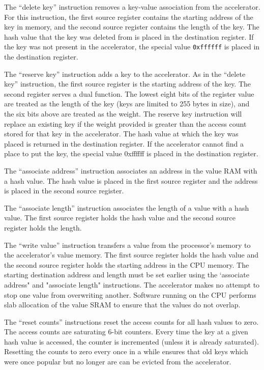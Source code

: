 The ``delete key'' instruction removes a key-value association from the
accelerator. For this instruction, the first source register contains the
starting address of the key in memory, and the second source register contains
the length of the key. The hash value that the key was deleted from is placed
in the destination register. If the key was not present in the accelerator,
the special value \texttt{0xffffff} is placed in the destination register.

The ``reserve key'' instruction adds a key to the accelerator. As in the
``delete key'' instruction, the first source register is the starting address
of the key. The second register serves a dual function. The lowest eight
bits of the register value are treated as the length of the key (keys are
limited to 255 bytes in size), and the six bits above are treated as the
weight. The reserve key instruction will replace an existing key if the
weight provided is greater than the access count stored for that key in the
accelerator. The hash value at which the key was placed is returned in the
destination register. If the accelerator cannot find a place to put the key,
the special value 0xffffff is placed in the destination register.

The ``associate address'' instruction associates an address in the value RAM
with a hash value. The hash value is placed in the first source register and
the address is placed in the second source register.

The ``associate length'' instruction associates the length of a value with a hash
value. The first source register holds the hash value and the second source
register holds the length.

The ``write value'' instruction transfers a value from the processor's memory to
the accelerator's value memory. The first source register holds the hash value
and the second source register holds the starting address in the CPU memory.
The starting destination address and length must be set earlier using the
`associate address" and "associate length" instructions. The accelerator makes
no attempt to stop one value from overwriting another. Software running on the
CPU performs slab allocation of the value SRAM to ensure that the values do
not overlap.

The ``reset counts'' instructions reset the access counts for all hash values
to zero. The access counts are saturating 6-bit counters. Every time the key
at a given hash value is accessed, the counter is incremented (unless it is
already saturated). Resetting the counts to zero every once in a while ensures
that old keys which were once popular but no longer are can be evicted from
the accelerator.

